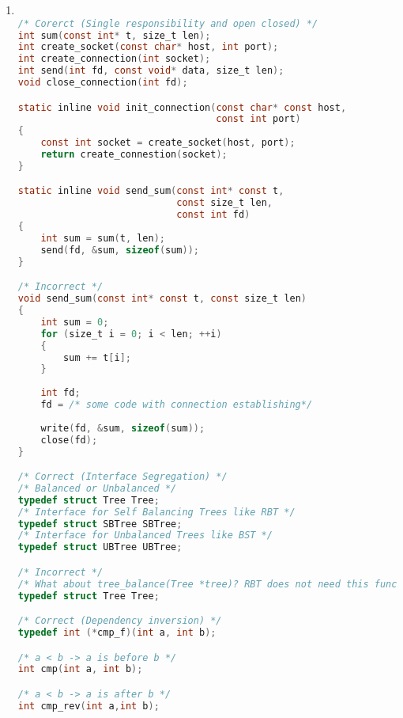 \begin{enumerate}
\begin{lstlisting}[language=C,style=C99]
	return -1;
}

/* Incorrect */
ssize_t find_key(const int* const t, const size_t len, const int key)
{
	if (len == 0) {return -1;}
	if (t[len - 1] == key) {return len - 1;}
	return find(t, len - 1, key);
}
	
ssize_t find_key(const int* const t, const size_t len, const int key)
{
	size_t i = 0;
	while (i < len && t[i] != key)
	{
		++i;
	}
		
	return (i == len) ? -1 : i;
}
	
\end{lstlisting}

    \item
\begin{lstlisting}[language=C,style=C99]

/* Corerct (Single responsibility and open closed) */
int sum(const int* t, size_t len);
int create_socket(const char* host, int port);
int create_connection(int socket);
int send(int fd, const void* data, size_t len);
void close_connection(int fd);

static inline void init_connection(const char* const host,
                                   const int port)
{
	const int socket = create_socket(host, port);
	return create_connestion(socket);
}

static inline void send_sum(const int* const t,
                            const size_t len,
                            const int fd)
{
	int sum = sum(t, len);
	send(fd, &sum, sizeof(sum));
}

/* Incorrect */
void send_sum(const int* const t, const size_t len)
{
	int sum = 0;
	for (size_t i = 0; i < len; ++i)
	{
		sum += t[i];
	}
		
	int fd;
	fd = /* some code with connection establishing*/
	
	write(fd, &sum, sizeof(sum));
	close(fd); 
}

/* Correct (Interface Segregation) */
/* Balanced or Unbalanced */
typedef struct Tree Tree;
/* Interface for Self Balancing Trees like RBT */
typedef struct SBTree SBTree;
/* Interface for Unbalanced Trees like BST */
typedef struct UBTree UBTree;

/* Incorrect */
/* What about tree_balance(Tree *tree)? RBT does not need this function */
typedef struct Tree Tree;

/* Correct (Dependency inversion) */
typedef int (*cmp_f)(int a, int b);

/* a < b -> a is before b */
int cmp(int a, int b);

/* a < b -> a is after b */
int cmp_rev(int a,int b);


\end{lstlisting}
\end{enumerate}

